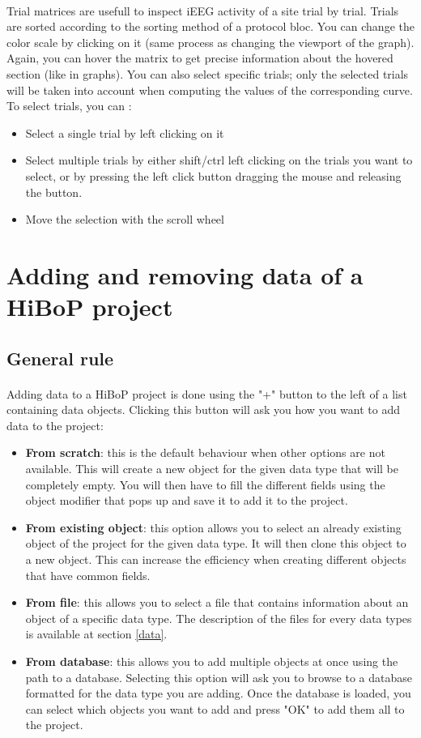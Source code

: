 \documentclass[a4paper]{article}
\begin{document}
\paragraph{} Trial matrices are usefull to inspect iEEG activity of a site trial by trial. Trials are sorted according to the sorting method of a protocol bloc. You can change the color scale by clicking on it (same process as changing the viewport of the graph). Again, you can hover the matrix to get precise information about the hovered section (like in graphs). You can also select specific trials; only the selected trials will be taken into account when computing the values of the corresponding curve. To select trials, you can :
\begin{itemize}
\item Select a single trial by left clicking on it
\item Select multiple trials by either shift/ctrl left clicking on the trials you want to select, or by pressing the left click button dragging the mouse and releasing the button.
\item Move the selection with the scroll wheel
\end{itemize}
\appendix
\section{Adding and removing data of a HiBoP project}\label{addobjects}
\subsection{General rule}
\paragraph{} Adding data to a HiBoP project is done using the "+" button to the left of a list containing data objects. Clicking this button will ask you how you want to add data to the project:
\begin{itemize}
\item \textbf{From scratch}: this is the default behaviour when other options are not available. This will create a new object for the given data type that will be completely empty. You will then have to fill the different fields using the object modifier that pops up and save it to add it to the project.
\item \textbf{From existing object}: this option allows you to select an already existing object of the project for the given data type. It will then clone this object to a new object. This can increase the efficiency when creating different objects that have common fields.
\item \textbf{From file}: this allows you to select a file that contains information about an object of a specific data type. The description of the files for every data types is available at section \ref{data}.
\item \textbf{From database}: this allows you to add multiple objects at once using the path to a database. Selecting this option will ask you to browse to a database formatted for the data type you are adding. Once the database is loaded, you can select which objects you want to add and press "OK" to add them all to the project.
\end{itemize}
\end{document}
